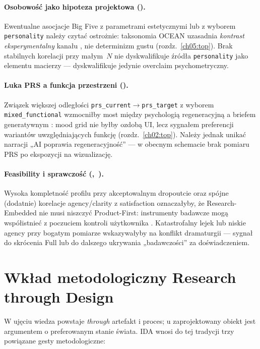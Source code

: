 \paragraph{Osobowość jako hipoteza projektowa ().}
Ewentualne asocjacje Big Five z parametrami estetycznymi lub z wyborem \texttt{personality} należy czytać ostrożnie: taksonomia OCEAN uzasadnia \emph{kontrast eksperymentalny} kanału \parencite{john2008bigfive}, nie determinizm gustu (rozdz.~\ref{ch05:top}).
Brak stabilnych korelacji przy małym~$N$ nie dyskwalifikuje źródła \texttt{personality} jako elementu macierzy --- dyskwalifikuje jedynie overclaim psychometryczny.

\paragraph{Luka PRS a funkcja przestrzeni ().}
Związek większej odległości \texttt{prs\_current}$\rightarrow$\texttt{prs\_target} z wyborem \texttt{mixed\_functional} wzmocniłby most między psychologią regeneracyjną a briefem generatywnym \parencite{kaplan1995restorative}: mood grid nie byłby ozdobą UI, lecz sygnałem preferencji wariantów uwzględniających funkcję (rozdz.~\ref{ch02:top}).
Należy jednak unikać narracji „AI poprawia regeneracyjność” --- w obecnym schemacie brak pomiaru PRS po ekspozycji na wizualizację.

\paragraph{Feasibility i sprawczość (,~).}
Wysoka kompletność profilu przy akceptowalnym dropoutcie oraz spójne (dodatnie) korelacje agency/clarity z satisfaction oznaczałyby, że Research-Embedded nie musi niszczyć Product-First: instrumenty badawcze mogą współistnieć z poczuciem kontroli użytkownika \parencite{zimmerman2007rtd,idaPlatform2026}.
Katastrofalny lejek lub niskie agency przy bogatym pomiarze wskazywałyby na konflikt dramaturgii --- sygnał do skrócenia Full lub do dalszego ukrywania „badawczości” za doświadczeniem.

\section{Wkład metodologiczny Research through Design}
\label{ch09:sec:rtd}

W ujęciu \textcite{frayling1993research} wiedza powstaje \emph{through} artefakt i proces; u \textcite{zimmerman2007rtd} zaprojektowany obiekt jest argumentem o preferowanym stanie świata.
IDA wnosi do tej tradycji trzy powiązane gesty metodologiczne:

